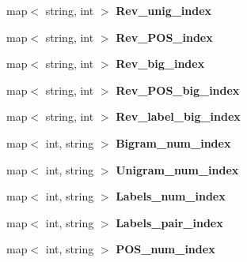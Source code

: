 \begin{DoxyCompactItemize}
\item 
\hypertarget{classFeatureset_a1103a830e903872379934f63be8d3977}{
map$<$ string, int $>$ {\bfseries Rev\_\-unig\_\-index}}
\label{classFeatureset_a1103a830e903872379934f63be8d3977}

\item 
\hypertarget{classFeatureset_af5a5667f725903de95c43cf78f05a4ac}{
map$<$ string, int $>$ {\bfseries Rev\_\-POS\_\-index}}
\label{classFeatureset_af5a5667f725903de95c43cf78f05a4ac}

\item 
\hypertarget{classFeatureset_a02cd0390ba42c78beebb17aff020ab77}{
map$<$ string, int $>$ {\bfseries Rev\_\-big\_\-index}}
\label{classFeatureset_a02cd0390ba42c78beebb17aff020ab77}

\item 
\hypertarget{classFeatureset_a542798fcfdf472a7decd2cad88e7b7b7}{
map$<$ string, int $>$ {\bfseries Rev\_\-POS\_\-big\_\-index}}
\label{classFeatureset_a542798fcfdf472a7decd2cad88e7b7b7}

\item 
\hypertarget{classFeatureset_a430610ad515145564e887bbf2bba3753}{
map$<$ string, int $>$ {\bfseries Rev\_\-label\_\-big\_\-index}}
\label{classFeatureset_a430610ad515145564e887bbf2bba3753}

\item 
\hypertarget{classFeatureset_a3ea7dd290f80fed46ff66c2a5b2cc1c6}{
map$<$ int, string $>$ {\bfseries Bigram\_\-num\_\-index}}
\label{classFeatureset_a3ea7dd290f80fed46ff66c2a5b2cc1c6}

\item 
\hypertarget{classFeatureset_a98725fcaaa81bed15c5e75eb9efc602c}{
map$<$ int, string $>$ {\bfseries Unigram\_\-num\_\-index}}
\label{classFeatureset_a98725fcaaa81bed15c5e75eb9efc602c}

\item 
\hypertarget{classFeatureset_a3dfc3871b2425e7311a25bedcd01e7d9}{
map$<$ int, string $>$ {\bfseries Labels\_\-num\_\-index}}
\label{classFeatureset_a3dfc3871b2425e7311a25bedcd01e7d9}

\item 
\hypertarget{classFeatureset_a8a8b6d4a38107ea08192ba25d37de99b}{
map$<$ int, string $>$ {\bfseries Labels\_\-pair\_\-index}}
\label{classFeatureset_a8a8b6d4a38107ea08192ba25d37de99b}

\item 
\hypertarget{classFeatureset_a52b1a17b3c50b64f90afe31949986d27}{
map$<$ int, string $>$ {\bfseries POS\_\-num\_\-index}}
\label{classFeatureset_a52b1a17b3c50b64f90afe31949986d27}


\end{DoxyCompactItemize}
